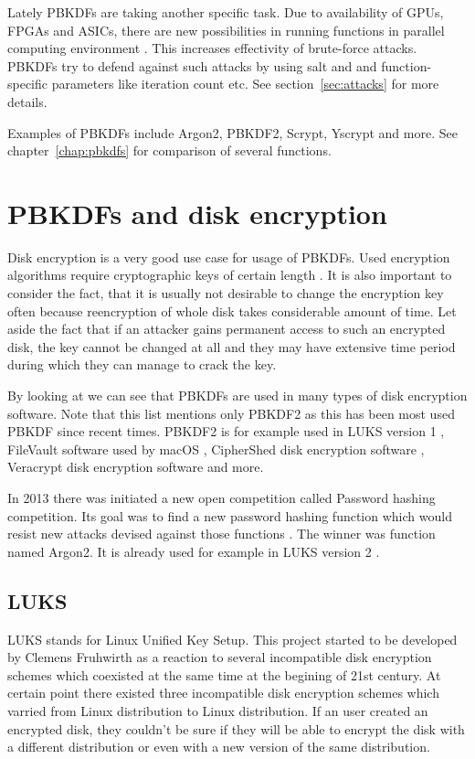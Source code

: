 \documentclass[nolof]{fithesis3}
\begin{document}
Lately PBKDFs are taking another specific task. Due to availability of GPUs, FPGAs and ASICs, there are  new possibilities in running functions in parallel computing environment \parencite[see][chapter 4]{mosnacek}. This increases effectivity of brute-force attacks. PBKDFs try to defend against such attacks by using salt and and function-specific parameters like iteration count etc. See section~\ref{sec:attacks} for more details.

Examples of PBKDFs include Argon2, PBKDF2, Scrypt, Yscrypt and more. See chapter~\ref{chap:pbkdfs} for comparison of several functions.

\section{PBKDFs and disk encryption}
Disk encryption is a very good use case for usage of PBKDFs. Used encryption algorithms require cryptographic keys of certain length \parencite{veracrypt}. It is also important to consider the fact, that it is usually not desirable to change the encryption key often because reencryption of whole disk takes considerable amount of time. Let aside the fact that if an attacker gains permanent access to such an encrypted disk, the key cannot be changed at all and they may have extensive time period during which they can manage to crack the key. 

By looking at \parencite{pbkdf2usage} we can see that PBKDFs are used in many types of disk encryption software. Note that this list mentions only PBKDF2 as this has been most used PBKDF since recent times. PBKDF2 is for example used in LUKS version 1 \parencite{luks1}, FileVault software used by macOS \parencite{filevault}, CipherShed disk encryption software \parencite{ciphershed}, Veracrypt disk encryption software \parencite{veracrypt} and more.

In 2013 there was initiated a new open competition called Password hashing competition. Its goal was to find a new password hashing function which would resist new attacks devised against those functions \parencite{phc}. The winner was function named Argon2. It is already used for example in LUKS version 2 \parencite{luks2}.

\subsection{LUKS}
LUKS stands for Linux Unified Key Setup. This project started to be developed by Clemens Fruhwirth as a reaction to several incompatible disk encryption schemes which coexisted at the same time at the begining of 21st century. At certain point there existed three incompatible disk encryption schemes which varried from Linux distribution to Linux distribution. If an user created an encrypted disk, they couldn't be sure if they will be able to encrypt the disk with a different distribution or even with a new version of the same distribution.
\end{document}
